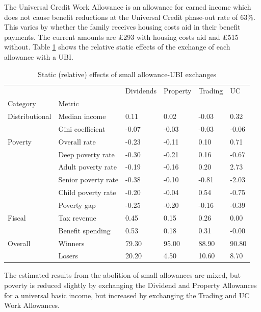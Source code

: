 \documentclass{article}
\begin{document}
    The Universal Credit Work Allowance is an allowance for earned income which does not cause benefit reductions at the Universal Credit phase-out rate of 63\%. This varies by whether the family receives housing costs aid in their benefit payments. The current amounts are £293 with housing costs aid and £515 without. Table \ref{tab:small_UBI_results} shows the relative static effects of the exchange of each allowance with a UBI.

    \begin{table}[h]
        \centering
        \begin{tabular}{llllll}
            \toprule
                    &        & Dividends & Property & Trading &     UC \\
            Category & Metric &           &          &         &        \\
            \midrule
            Distributional & Median income &      0.11 &     0.02 &   -0.03 &   0.32 \\
                    & Gini coefficient &     -0.07 &    -0.03 &   -0.03 &  -0.06 \\
            Poverty & Overall rate &     -0.23 &    -0.11 &    0.10 &   0.71 \\
                    & Deep poverty rate &     -0.30 &    -0.21 &    0.16 &  -0.67 \\
                    & Adult poverty rate &     -0.19 &    -0.16 &    0.20 &   2.73 \\
                    & Senior poverty rate &     -0.38 &    -0.10 &   -0.81 &  -2.03 \\
                    & Child poverty rate &     -0.20 &    -0.04 &    0.54 &  -0.75 \\
                    & Poverty gap &     -0.25 &    -0.20 &   -0.16 &  -0.39 \\
            Fiscal & Tax revenue &      0.45 &     0.15 &    0.26 &   0.00 \\
                    & Benefit spending &      0.53 &     0.18 &    0.31 &  -0.00 \\
            Overall & Winners &     79.30 &    95.00 &   88.90 &  90.80 \\
                    & Losers &     20.20 &     4.50 &   10.60 &   8.70 \\
            \bottomrule
            \end{tabular}
        \caption{Static (relative) effects of small allowance-UBI exchanges}
        \label{tab:small_UBI_results}
    \end{table}
    The estimated results from the abolition of small allowances are mixed, but poverty is reduced slightly by exchanging the Dividend and Property Allowances for a universal basic income, but increased by exchanging the Trading and UC Work Allowances.
\end{document}

